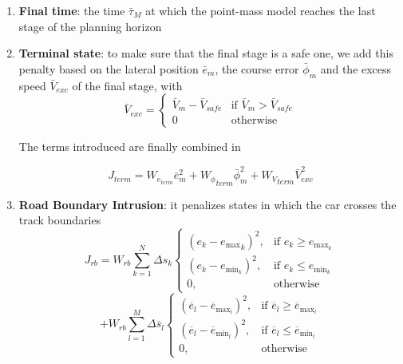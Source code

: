 \documentclass[a4paper, onecolumn, 11pt]{article}
\begin{document}
\begin{enumerate}
    \item \textbf{Final time}: the time $\bar{\tau}_M$ at which the point-mass model reaches the last stage of the planning horizon
    \item \textbf{Terminal state}: to make sure that the final stage is a safe one, we add this penalty based on the 
    lateral position ${\bar{e}}_m$, the course error ${\bar{\phi}}_m$ and the excess speed ${\bar{V}}_{exc}$ of the final stage, with
    \begin{equation}
    {\bar{V}}_{exc} = 
    \left\{
	\begin{array}{ll}
		{\bar{V}}_m - {{\bar{V}}_{safe}}
        & \mbox{if } {\bar{V}}_m > {{\bar{V}}_{safe}} \\
	0 & \mbox{otherwise }
	\end{array}
    \right.
    \end{equation}

    The terms introduced are finally combined in
    
    \begin{equation}{J}_{term} = W_{e_{term}}{\bar{e}}_m^2 + {W_{\phi}}_{term}{\bar{\phi}}_m^2 + {W_V}_{term}{\bar{V}}_{exc}^2
    \end{equation}

    \item \textbf{Road Boundary Intrusion}: it penalizes states in which the car crosses the track boundaries
    \begin{equation}
    J_{rb} = W_{rb}\sum_{k=1}^{N} \Delta s_k \begin{cases}
    (e_k - {e_{\text{max}}}_k)^2, & \text{if } e_k \geq e_{\text{max}_k} \\
    (e_k - e_{\text{min}_k})^2, & \text{if } e_k \leq e_{\text{min}_k} \\
    0, & \text{otherwise}
    \end{cases}
    \end{equation}
    \[  + W_{rb}\sum_{l=1}^{M} \Delta\overline{s}_l \begin{cases}
    (\overline{e}_l - \overline{e}_{\text{max}_l})^2, & \text{if } \overline{e}_l \geq \overline{e}_{\text{max}_l} \\
    (\overline{e}_l - \overline{e}_{\text{min}_l})^2, & \text{if } \overline{e}_l \leq \overline{e}_{\text{min}_l} \\
    0, & \text{otherwise}
    \end{cases}
    \]


\end{enumerate}
\end{document}
